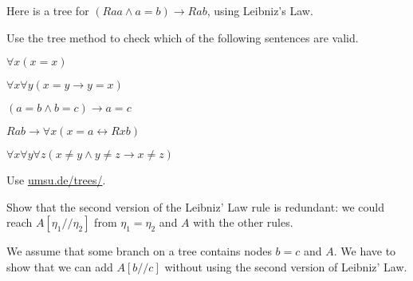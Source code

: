 \bigskip

Here is a tree for $(Raa \land a\!=\!b) \to Rab$, using Leibniz's Law.

\medskip
\begin{center}
\end{center}

\begin{exercise}
  Use the tree method to check which of the following sentences are valid.
  \begin{exlist}
  \item $\forall x (x\!=\!x)$
  \item $\forall x \forall y(x\!=\!y \to y\!=\!x)$
  \item $(a=b \land b=c) \to a=c$
  \item $Rab \to \forall x(x=a \leftrightarrow Rxb)$
  \item $\forall x \forall y\forall z(x\not= y \land y\not= z \to x \not= z)$
  \end{exlist}
\end{exercise}
\begin{solution}
  Use \href{https://www.umsu.de/trees/}{umsu.de/trees/}.
\end{solution}

\begin{exercise}
  Show that the second version of the Leibniz' Law rule is redundant: we could
  reach $A[\eta_1//\eta_2]$ from $\eta_1=\eta_2$ and $A$ with the other rules.
\end{exercise}
\begin{solution}
  We assume that some branch on a tree contains nodes $b=c$ and $A$. We have to
  show that we can add $A[b//c]$ without using the second version of Leibniz'
  Law.
\end{solution}

